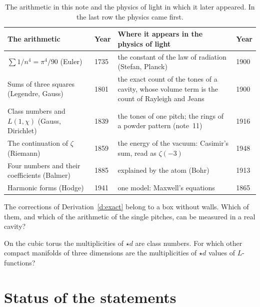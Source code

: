 \documentclass[11pt]{article}
\begin{document}
\begin{table}[ht]
\centering
\small
\begin{tabular}{@{}p{}l@{\quad}p{}l@{}}
\toprule
The arithmetic & Year & Where it appears in the physics of light & Year\\
\midrule
$\sum 1/n^4 = \pi^4/90$ (Euler) & 1735 & the constant of the law of radiation (Stefan, Planck) & 1900\\
Sums of three squares (Legendre, Gauss) & 1801 & the exact count of the tones of a cavity, whose volume term is the count of Rayleigh and Jeans & 1900\\
Class numbers and $L(1,\chi)$ (Gauss, Dirichlet) & 1839 & the tones of one pitch; the rings of a powder pattern (note~11) & 1916\\
The continuation of $\zeta$ (Riemann) & 1859 & the energy of the vacuum: Casimir's sum, read as $\zeta(-3)$ & 1948\\
Four numbers and their coefficients (Balmer) & 1885 & explained by the atom (Bohr) & 1913\\
\midrule
Harmonic forms (Hodge) & 1941 & one model: Maxwell's equations \cite{Maxwell} & 1865\\
\bottomrule
\end{tabular}
\caption{The arithmetic in this note and the physics of light in which it later appeared. In the last row the physics came first.}
\label{tab:dates}
\end{table}

\begin{question}[open]
The corrections of Derivation~\ref{d:exact} belong to a box without walls. Which of them, and which of the arithmetic of the single pitches, can be measured in a real cavity?
\end{question}

\begin{question}[open]
On the cubic torus the multiplicities of ${\star}d$ are class numbers. For which other compact manifolds of three dimensions are the multiplicities of ${\star}d$ values of $L$-functions?
\end{question}

\section*{Status of the statements}
\end{document}
